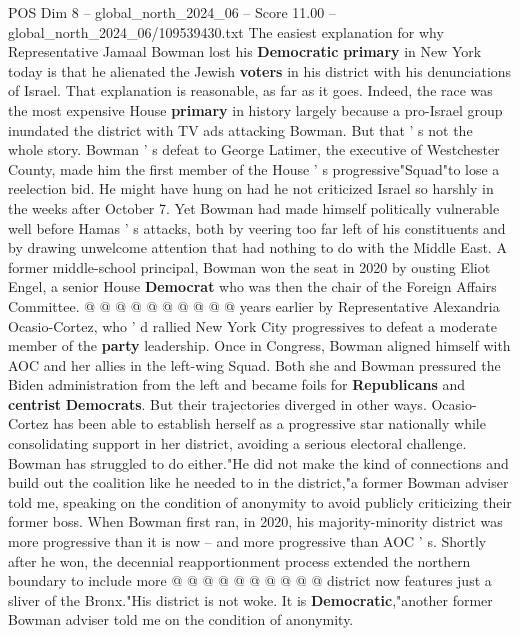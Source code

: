 \begin{textsample}{POS Dim 8 – global\_north\_2024\_06 – Score 11.00 – global\_north\_2024\_06/109539430.txt}  \label{ex:f8_pos_064}
The easiest explanation for why Representative Jamaal Bowman lost his \textbf{Democratic} \textbf{primary} in New York today is that he alienated the Jewish \textbf{voters} in his district with his denunciations of Israel.
That explanation is reasonable, as far as it goes.
Indeed, the race was the most expensive House \textbf{primary} in history largely because a pro-Israel group inundated the district with TV ads attacking Bowman.
But that ' s not the whole story.
Bowman ' s defeat to George Latimer, the executive of Westchester County, made him the first member of the House ' s progressive"Squad"to lose a reelection bid.
He might have hung on had he not criticized Israel so harshly in the weeks after October 7.
Yet Bowman had made himself politically vulnerable well before Hamas ' s attacks, both by veering too far left of his constituents and by drawing unwelcome attention that had nothing to do with the Middle East.
A former middle-school principal, Bowman won the seat in 2020 by ousting Eliot Engel, a senior House \textbf{Democrat} who was then the chair of the Foreign Affairs Committee. @ @ @ @ @ @ @ @ @ @ years earlier by Representative Alexandria Ocasio-Cortez, who ' d rallied New York City progressives to defeat a moderate member of the \textbf{party} leadership.
Once in Congress, Bowman aligned himself with AOC and her allies in the left-wing Squad.
Both she and Bowman pressured the Biden administration from the left and became foils for \textbf{Republicans} and \textbf{centrist} \textbf{Democrats}.
But their trajectories diverged in other ways.
Ocasio-Cortez has been able to establish herself as a progressive star nationally while consolidating support in her district, avoiding a serious electoral challenge.
Bowman has struggled to do either."He did not make the kind of connections and build out the coalition like he needed to in the district,"a former Bowman adviser told me, speaking on the condition of anonymity to avoid publicly criticizing their former boss.
When Bowman first ran, in 2020, his majority-minority district was more progressive than it is now -- and more progressive than AOC ' s.
Shortly after he won, the decennial reapportionment process extended the northern boundary to include more @ @ @ @ @ @ @ @ @ @ district now features just a sliver of the Bronx."His district is not woke.
It is \textbf{Democratic},"another former Bowman adviser told me on the condition of anonymity.

\end{textsample}
